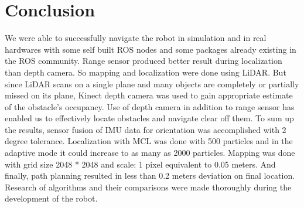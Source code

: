 \documentclass[journal,twoside]{IEEEtran}
\begin{document}
\section{Conclusion}
\noindent We were able to successfully navigate the robot in simulation and in real hardwares with some self built ROS nodes and some packages already existing in the ROS community. Range sensor produced better result during localization than depth camera. So mapping and localization were done using LiDAR. But since LiDAR scans on a single plane and many objects are completely or partially missed on its plane, Kinect depth camera was used to gain appropriate estimate of the obstacle’s occupancy. Use of depth camera in addition to range sensor has enabled us to effectively locate obstacles
and navigate clear off them. To sum up the results, sensor fusion of IMU data for orientation was accomplished with 2 degree tolerance. Localization with MCL was done with 500 particles and in the adaptive mode it could increase to as many as 2000 particles. Mapping was done with grid size 2048 * 2048 and scale: 1 pixel equivalent to 0.05 meters. And finally, path planning resulted in less than 0.2 meters deviation on final location. Research of algorithms and their comparisons were made thoroughly during the development of the robot.



%
%

\end{document}
